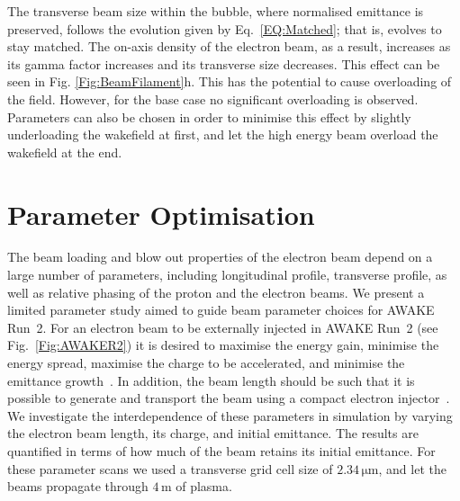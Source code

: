 \documentclass[aps,prstab,reprint,amsmath,amssymb,groupedaddress]{revtex4-1}
\newcommand{\unit}[1]{\,\mathrm{#1}}
\begin{document}
The transverse beam size within the bubble, where normalised emittance is preserved, follows the evolution given by Eq.~\ref{EQ:Matched}; that is, evolves to stay matched. The on-axis density of the electron beam, as a result, increases as its gamma factor increases and its transverse size decreases. This effect can be seen in Fig. \ref{Fig:BeamFilament}h. This has the potential to cause overloading of the field. However, for the base case no significant overloading is observed. Parameters can also be chosen in order to minimise this effect by slightly underloading the wakefield at first, and let the high energy beam overload the wakefield at the end.

\section{Parameter Optimisation}\label{S:PO}

The beam loading and blow out properties of the electron beam depend on a large number of parameters, including longitudinal profile, transverse profile, as well as relative phasing of the proton and the electron beams. We present a limited parameter study aimed to guide beam parameter choices for AWAKE Run~2. For an electron beam to be externally injected in AWAKE Run~2 (see Fig.~\ref{Fig:AWAKER2}) it is desired to maximise the energy gain, minimise the energy spread, maximise the charge to be accelerated, and minimise the emittance growth~\cite{adli:2016}. In addition, the beam length should be such that it is possible to generate and transport the beam using a compact electron injector~\cite{adli:2016}. We investigate the interdependence of these parameters in simulation by varying the electron beam length, its charge, and initial emittance. The results are quantified in terms of how much of the beam retains its initial emittance. For these parameter scans we used a transverse grid cell size of $2.34\unit{\mu m}$, and let the beams propagate through $4\unit{m}$ of plasma.
\end{document}
